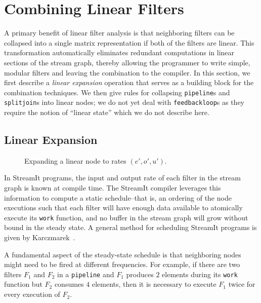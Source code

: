 \section{Combining Linear Filters}
\label{sec:combine}

A primary benefit of linear filter analysis is that neighboring
filters can be collapsed into a single matrix representation if both
of the filters are linear.  This transformation automatically
eliminates redundant computations in linear sections of the stream
graph, thereby allowing the programmer to write simple, modular
filters and leaving the combination to the compiler.  In this section,
we first describe a {\it linear expansion} operation that serves as a
building block for the combination techniques.  We then give rules for
collapsing {\tt pipeline}s and {\tt splitjoin}s into linear nodes; we
do not yet deal with {\tt feedbackloop}s as they require the notion of
``linear state'' which we do not describe here.

\subsection{Linear Expansion}

\begin{figure}[t]
\center
\vspace{-12pt}
\epsfxsize=3.2in
\vspace{-12pt}
\caption{Expanding a linear node to rates $(e', o', u')$.  }
\label{fig:expanding-a-matrix}
\vspace{-24pt}
\end{figure}

In StreamIt programs, the input and output rate of each filter in the
stream graph is known at compile time.  The StreamIt compiler
leverages this information to compute a static schedule--that is, an
ordering of the node executions such that each filter will have enough
data available to atomically execute its {\tt work} function, and no
buffer in the stream graph will grow without bound in the steady
state.  A general method for scheduling StreamIt programs is given by
Karczmarek~\cite{karczma-thesis}.

A fundamental aspect of the steady-state schedule is that neighboring
nodes might need to be fired at different frequencies.  For example,
if there are two filters $F_1$ and $F_2$ in a {\tt pipeline} and
$F_1$ produces $2$ elements during its {\tt work} function but $F_2$
consumes $4$ elements, then it is necessary to execute $F_1$ twice for
every execution of $F_2$.

